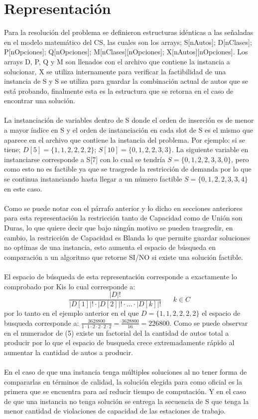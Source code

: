 \documentclass[letter, 10pt]{article}
\begin{document}
\section{Representaci\'on}
Para la resoluci\'on del problema se definieron estructuras id\'enticas a las se\~{n}aladas en el modelo matem\'atico del CS, las cuales son los arrays; S[nAutos]; D[nClases]; P[nOpciones]; Q[nOpciones]; M[nClases][nOpciones]; X[nAutos][nOpciones]. Los arrays D, P, Q y M son llenados con el archivo que contiene la instancia a solucionar, X se utiliza internamente para verificar la factibilidad de una instancia de S y S se utiliza para guardar la combinaci\'on actual de autos que se est\'a probando, finalmente esta es la estructura que se retorna en el caso de encontrar una soluci\'on.\\\\
La instanciaci\'on de variables dentro de S donde el orden de inserci\'on es de menor a mayor \'indice en S y el orden de instanciaci\'on en cada slot de S es el mismo que aparece en el archivo que contiene la instancia del problema. Por ejemplo: si se tiene; $D[5] = \{1, 1, 2, 2, 2, 2\}$; $S[10] = \{0, 1, 2, 2, 3, 3\}$. La siguiente variable en instanciarse corresponde a S[7] con lo cual se tendr\'ia $S = \{0, 1, 2, 2, 3, 3, 0\}$, pero como esto no es factible ya que se trasgrede la restricci\'on de demanda por lo que se continua instanciando hasta llegar a un n\'umero factible $S = \{0, 1, 2, 2, 3, 3, 4\}$ en este caso.\\\\
Como se puede notar con el p\'arrafo anterior y lo dicho en secciones anteriores para esta representaci\'on la restricci\'on tanto de Capacidad como de Uni\'on son Duras, lo que quiere decir que bajo ning\'un motivo se pueden trasgredir, en cambio, la restricci\'on de Capacidad es Blanda lo que permite guardar soluciones no optimas de una instancia, esto aumenta el espacio de b\'usqueda en comparaci\'on a un algoritmo que retorne SI/NO si existe una soluci\'on factible.\\\\
El espacio de b\'usqueda de esta representaci\'on corresponde a exactamente lo comprobado por Kis \cite{Tamas} lo cual corresponde a:
\begin{equation}
    \frac{|D|!}{|D[1]|!\cdot|D[2]|!\cdot...\cdot|D[k]|!}\hspace{20pt}k \in C 
\end{equation}
por lo tanto en el ejemplo anterior en el que $D = \{1,1,2,2,2,2\}$ el espacio de busqueda corresponde a: $\frac{3628800}{1\cdot1\cdot2\cdot2\cdot2\cdot2} = \frac{3628800}{16} = 226800$. Como se puede observar en el numerador de (5) existe un factorial del la cantidad de autos total a producir por lo que el espacio de busqueda crece extremadamente r\'apido al aumentar la cantidad de autos a producir.\\\\
En el caso de que una instancia tenga m\'ultiples soluciones al no tener forma de compararlas en t\'erminos de calidad, la soluci\'on elegida para como oficial es la primera que se encuentra para as\'i reducir tiempo de computaci\'on. Y en el caso de que una instancia no tenga soluci\'on se entrega la secuencia de S que tenga la menor cantidad de violaciones de capacidad de las estaciones de trabajo.
\end{document}
